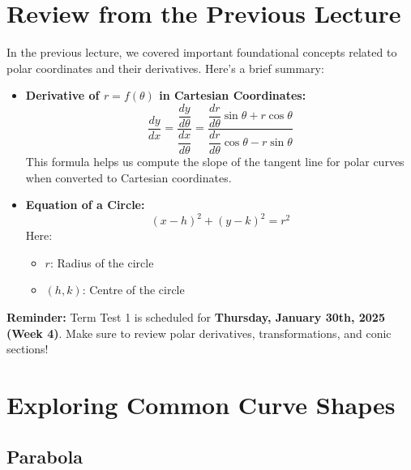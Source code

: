 \documentclass{article}
\begin{document}
\section*{Review from the Previous Lecture}
\begin{remarkbox}
In the previous lecture, we covered important foundational concepts related to polar coordinates and their derivatives. Here’s a brief summary: 

\begin{itemize}
    \item \textbf{Derivative of \( r = f(\theta) \) in Cartesian Coordinates:}
    \large
    \[
        \dfrac{dy}{dx} = \dfrac{\dfrac{dy}{d\theta}}{\dfrac{dx}{d\theta}} = \dfrac{\dfrac{dr}{d\theta}\sin\theta + r\cos\theta}{\dfrac{dr}{d\theta}\cos\theta - r\sin\theta}
    \]
    \normalsize
    This formula helps us compute the slope of the tangent line for polar curves when converted to Cartesian coordinates. 

    \item \textbf{Equation of a Circle:}
    \[
        (x-h)^2 + (y-k)^2 = r^2
    \]
    Here:
    \begin{itemize}
        \item[\labelitemi] \( r \): Radius of the circle
        \item[\labelitemi] \( (h, k) \): Centre of the circle
    \end{itemize}    
\end{itemize}

\begin{notebox}
\textbf{Reminder:} Term Test 1 is scheduled for \textbf{Thursday, January 30th, 2025 (Week 4)}. Make sure to review polar derivatives, transformations, and conic sections!
\end{notebox}
\end{remarkbox}

\section*{Exploring Common Curve Shapes}

\subsection*{Parabola}
\end{document}
